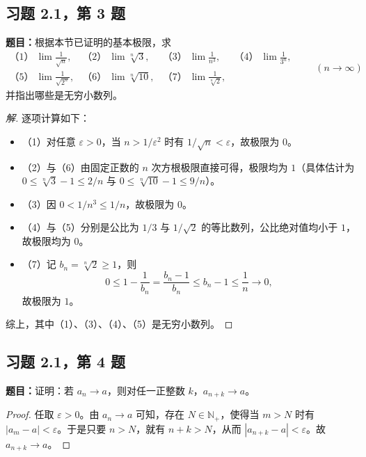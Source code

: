 \documentclass[UTF8, fontset=fandol, a4paper, 12pt]{ctexart}
\newcommand{\Nplus}{\mathbb N_{+}}
\theoremstyle{definition}
\begin{document}
\subsection{习题 2.1，第 3 题}
\noindent\textbf{题目：}根据本节已证明的基本极限，求
\[
\begin{array}{llll}
\text{（1）}\ \displaystyle\lim\frac1{\sqrt n},&
\text{（2）}\ \displaystyle\lim\sqrt[n]{3},&
\text{（3）}\ \displaystyle\lim\frac1{n^3},&
\text{（4）}\ \displaystyle\lim\frac1{3^n},\\[0.5em]
\text{（5）}\ \displaystyle\lim\frac1{\sqrt{2^n}},&
\text{（6）}\ \displaystyle\lim\sqrt[n]{10},&
\text{（7）}\ \displaystyle\lim\frac1{\sqrt[n]{2}},
\end{array}
\qquad(n\to\infty)
\]
并指出哪些是无穷小数列。

\begin{proof}[解]
逐项计算如下：
\begin{itemize}[leftmargin=2em,itemsep=0.2em]
\item （1）对任意 $\varepsilon>0$，当 $n>1/\varepsilon^2$ 时有 $1/\sqrt n<\varepsilon$，故极限为 $0$。
\item （2）与（6）由固定正数的 $n$ 次方根极限直接可得，极限均为 $1$（具体估计为 $0\le\sqrt[n]3-1\le2/n$ 与 $0\le\sqrt[n]{10}-1\le9/n$）。
\item （3）因 $0<1/n^3\le1/n$，故极限为 $0$。
\item （4）与（5）分别是公比为 $1/3$ 与 $1/\sqrt2$ 的等比数列，公比绝对值均小于 $1$，故极限均为 $0$。
\item （7）记 $b_n=\sqrt[n]2\ge1$，则
\[
 0\le1-\frac1{b_n}=\frac{b_n-1}{b_n}
 \le b_n-1\le\frac1n\to0,
\]
故极限为 $1$。
\end{itemize}
综上，其中（1）、（3）、（4）、（5）是无穷小数列。
\end{proof}

\subsection{习题 2.1，第 4 题}
\noindent\textbf{题目：}证明：若 $a_n\to a$，则对任一正整数 $k$，$a_{n+k}\to a$。
\begin{proof}
任取 $\varepsilon>0$。由 $a_n\to a$ 可知，存在 $N\in\Nplus$，使得当 $m>N$ 时有 $|a_m-a|<\varepsilon$。于是只要 $n>N$，就有 $n+k>N$，从而 $|a_{n+k}-a|<\varepsilon$。故 $a_{n+k}\to a$。
\end{proof}
\end{document}
